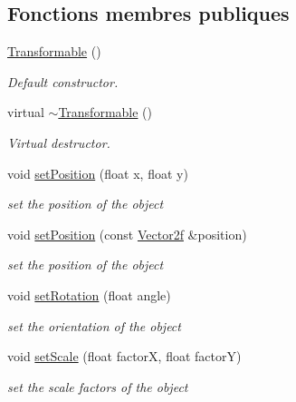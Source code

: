 \subsection*{Fonctions membres publiques}
\begin{DoxyCompactItemize}
\item 
\mbox{\label{classsf_1_1Transformable_ae71710de0fef423121bab1c684954a2e}} 
\hyperlink{classsf_1_1Transformable_ae71710de0fef423121bab1c684954a2e}{Transformable} ()
\begin{DoxyCompactList}\small\item\em Default constructor. \end{DoxyCompactList}\item 
\mbox{\label{classsf_1_1Transformable_a43253abcb863195a673c2a347a7425cc}} 
virtual \hyperlink{classsf_1_1Transformable_a43253abcb863195a673c2a347a7425cc}{$\sim$\+Transformable} ()
\begin{DoxyCompactList}\small\item\em Virtual destructor. \end{DoxyCompactList}\item 
void \hyperlink{classsf_1_1Transformable_a4dbfb1a7c80688b0b4c477d706550208}{set\+Position} (float x, float y)
\begin{DoxyCompactList}\small\item\em set the position of the object \end{DoxyCompactList}\item 
void \hyperlink{classsf_1_1Transformable_af1a42209ce2b5d3f07b00f917bcd8015}{set\+Position} (const \hyperlink{classsf_1_1Vector2}{Vector2f} \&position)
\begin{DoxyCompactList}\small\item\em set the position of the object \end{DoxyCompactList}\item 
void \hyperlink{classsf_1_1Transformable_a32baf2bf1a74699b03bf8c95030a38ed}{set\+Rotation} (float angle)
\begin{DoxyCompactList}\small\item\em set the orientation of the object \end{DoxyCompactList}\item 
void \hyperlink{classsf_1_1Transformable_aaec50b46b3f41b054763304d1e727471}{set\+Scale} (float factorX, float factorY)
\begin{DoxyCompactList}\small\item\em set the scale factors of the object \end{DoxyCompactList}\item 

\end{DoxyCompactItemize}

